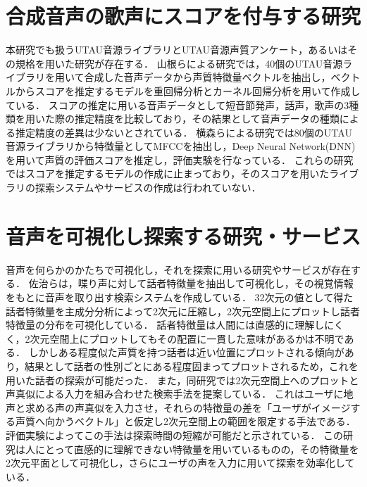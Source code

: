 \section{合成音声の歌声にスコアを付与する研究}
本研究でも扱うUTAU音源ライブラリとUTAU音源声質アンケート，あるいはその規格を用いた研究が存在する．
山根らによる研究\cite{ong}では，40個のUTAU音源ライブラリを用いて合成した音声データから声質特徴量ベクトルを抽出し，ベクトルからスコアを推定するモデルを重回帰分析とカーネル回帰分析を用いて作成している．
スコアの推定に用いる音声データとして短音節発声，話声，歌声の3種類を用いた際の推定精度を比較しており，その結果として音声データの種類による推定精度の差異は少ないとされている．
横森らによる研究\cite{dnn}では80個のUTAU音源ライブラリから特徴量としてMFCCを抽出し，Deep Neural Network(DNN)を用いて声質の評価スコアを推定し，評価実験を行なっている．
これらの研究ではスコアを推定するモデルの作成に止まっており，そのスコアを用いたライブラリの探索システムやサービスの作成は行われていない．

\section{音声を可視化し探索する研究・サービス}
音声を何らかのかたちで可視化し，それを探索に用いる研究やサービスが存在する．
佐治らは，喋り声に対して話者特徴量を抽出して可視化し，その視覚情報をもとに音声を取り出す検索システムを作成している\cite{talk_search}．
32次元の値として得た話者特徴量を主成分分析によって2次元に圧縮し，2次元空間上にプロットし話者特徴量の分布を可視化している．
話者特徴量は人間には直感的に理解しにくく，2次元空間上にプロットしてもその配置に一貫した意味があるかは不明である．
しかしある程度似た声質を持つ話者は近い位置にプロットされる傾向があり，結果として話者の性別ごとにある程度固まってプロットされるため，これを用いた話者の探索が可能だった．
また，同研究では2次元空間上へのプロットと声真似による入力を組み合わせた検索手法を提案している．
これはユーザに地声と求める声の声真似を入力させ，それらの特徴量の差を「ユーザがイメージする声質へ向かうベクトル」と仮定し2次元空間上の範囲を限定する手法である．
評価実験によってこの手法は探索時間の短縮が可能だと示されている．
この研究は人にとって直感的に理解できない特徴量を用いているものの，その特徴量を2次元平面として可視化し，さらにユーザの声を入力に用いて探索を効率化している．

